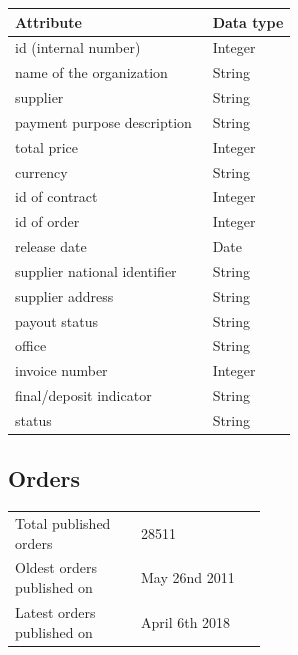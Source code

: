 \documentclass[thesis=B,english]{FITthesis}[2012/06/26]
\begin{document}
    \begin{center}
        \begin{tabular}{  p{0.7\linewidth} | p{0.3\linewidth} }
        Attribute & Data type\\ \hline
        id (internal number) & Integer \\
        name of the organization & String \\
        supplier & String \\
        payment purpose description & String \\
        total price & Integer \\
        currency & String \\
        id of contract & Integer \\
        id of order & Integer \\
        release date & Date \\
        supplier national identifier & String \\
        supplier address & String \\
        payout status & String \\
        office & String \\
        invoice number & Integer \\
        final/deposit indicator & String \\
        status & String \\
        \end{tabular}
    \end{center}
	\subsection{Orders}
	\begin{tabular}{  p{0.5\linewidth}  l }
        \\
        Total published orders & 28511 \\
        Oldest orders published on & May 26nd 2011\\
        Latest orders published on & April 6th 2018 \\
        \end{tabular}
        
\end{document}
